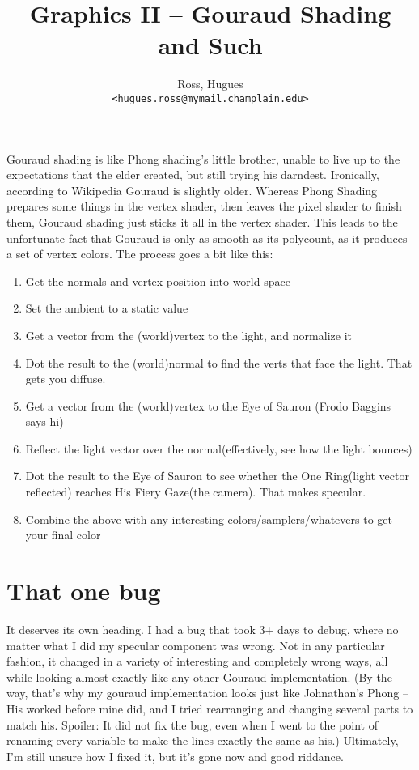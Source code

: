 \documentclass[11pt, english]{article}
\author{Ross, Hugues\\
    \texttt{<hugues.ross@mymail.champlain.edu>}
}
\title{Graphics II -- Gouraud Shading and Such}
\begin{document}
\maketitle
Gouraud shading is like Phong shading's little brother, unable to live up to the expectations that the elder created, but still trying his darndest.
Ironically, according to Wikipedia Gouraud is slightly older.
Whereas Phong Shading prepares some things in the vertex shader, then leaves the pixel shader to finish them, Gouraud shading just sticks it all in the vertex shader.
This leads to the unfortunate fact that Gouraud is only as smooth as its polycount, as it produces a set of vertex colors.
The process goes a bit like this:
\begin{enumerate}
\item Get the normals and vertex position into world space
\item Set the ambient to a static value
\item Get a vector from the (world)vertex to the light, and normalize it
\item Dot the result to the (world)normal to find the verts that face the light. That gets you diffuse.
\item Get a vector from the (world)vertex to the Eye of Sauron (Frodo Baggins says hi)
\item Reflect the light vector over the normal(effectively, see how the light bounces)
\item Dot the result to the Eye of Sauron to see whether the One Ring(light vector reflected) reaches His Fiery Gaze(the camera). That makes specular.
\item Combine the above with any interesting colors/samplers/whatevers to get your final color
\end{enumerate}
\section{That one bug}
It deserves its own heading.
I had a bug that took 3+ days to debug, where no matter what I did my specular component was wrong.
Not in any particular fashion, it changed in a variety of interesting and completely wrong ways, all while looking almost exactly like any other Gouraud implementation.
(By the way, that's why my gouraud implementation looks just like Johnathan's Phong -- His worked before mine did, and I tried rearranging and changing several parts to match his. Spoiler: It did not fix the bug, even when I went to the point of renaming every variable to make the lines exactly the same as his.)
Ultimately, I'm still unsure how I fixed it, but it's gone now and good riddance.
\end{document}
